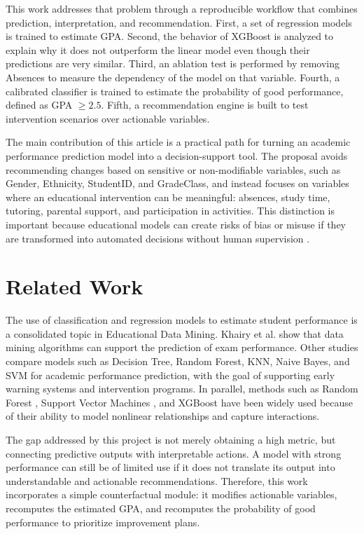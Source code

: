 \documentclass[12pt,onecolumn]{IEEEtran}
\begin{document}
This work addresses that problem through a reproducible workflow that combines prediction, interpretation, and recommendation. First, a set of regression models is trained to estimate GPA. Second, the behavior of XGBoost is analyzed to explain why it does not outperform the linear model even though their predictions are very similar. Third, an ablation test is performed by removing Absences to measure the dependency of the model on that variable. Fourth, a calibrated classifier is trained to estimate the probability of good performance, defined as GPA $\geq 2.5$. Fifth, a recommendation engine is built to test intervention scenarios over actionable variables.

The main contribution of this article is a practical path for turning an academic performance prediction model into a decision-support tool. The proposal avoids recommending changes based on sensitive or non-modifiable variables, such as Gender, Ethnicity, StudentID, and GradeClass, and instead focuses on variables where an educational intervention can be meaningful: absences, study time, tutoring, parental support, and participation in activities. This distinction is important because educational models can create risks of bias or misuse if they are transformed into automated decisions without human supervision \cite{hardt2016equality,barocas2023fairness}.

\section{Related Work}

The use of classification and regression models to estimate student performance is a consolidated topic in Educational Data Mining. Khairy et al. \cite{khairy2024prediction} show that data mining algorithms can support the prediction of exam performance. Other studies compare models such as Decision Tree, Random Forest, KNN, Naive Bayes, and SVM for academic performance prediction, with the goal of supporting early warning systems and intervention programs. In parallel, methods such as Random Forest \cite{breiman2001random}, Support Vector Machines \cite{cortes1995support}, and XGBoost \cite{chen2016xgboost} have been widely used because of their ability to model nonlinear relationships and capture interactions.

The gap addressed by this project is not merely obtaining a high metric, but connecting predictive outputs with interpretable actions. A model with strong performance can still be of limited use if it does not translate its output into understandable and actionable recommendations. Therefore, this work incorporates a simple counterfactual module: it modifies actionable variables, recomputes the estimated GPA, and recomputes the probability of good performance to prioritize improvement plans.
\end{document}
